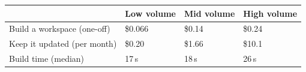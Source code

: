 \begin{center}\small\renewcommand{\arraystretch}{1.35}
\begin{tabularx}{\linewidth}{@{}P{5.2cm}LLL@{}}
\toprule
& \textbf{Low volume} & \textbf{Mid volume} & \textbf{High volume} \\
\midrule
Build a workspace (one-off) & \$0.066 & \$0.14 & \$0.24 \\
Keep it updated (per month) & \$0.20 & \$1.66 & \$10.1 \\
Build time (median) & 17\,s & 18\,s & 26\,s \\
\bottomrule
\end{tabularx}\end{center}
